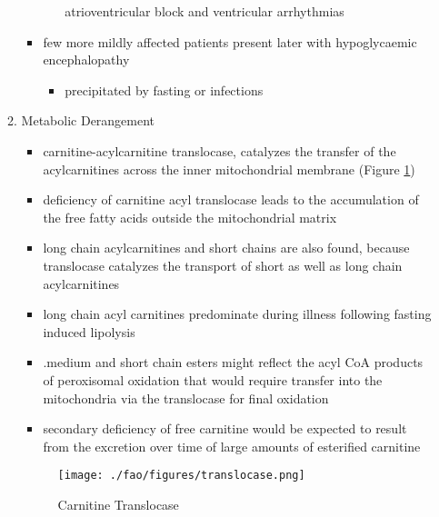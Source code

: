 \documentclass{scrartcl}
\begin{document}
\begin{enumerate}
\begin{enumerate}
\begin{itemize}
\begin{itemize}
atrioventricular block and ventricular arrhythmias
\end{itemize}
\item few more mildly affected patients present later with hypoglycaemic
encephalopathy
\begin{itemize}
\item precipitated by fasting or infections
\end{itemize}
\end{itemize}
\item Metabolic Derangement
\label{sec:orga067332}
\begin{itemize}
\item carnitine-acylcarnitine translocase, catalyzes the transfer of the
acylcarnitines across the inner mitochondrial membrane (Figure \ref{fig:orge1080ca})
\item deficiency of carnitine acyl translocase leads to the accumulation
of the free fatty acids outside the mitochondrial matrix
\item long chain acylcarnitines and short chains are also found, because
translocase catalyzes the transport of short as well as long chain
acylcarnitines
\item long chain acyl carnitines predominate during illness following
fasting induced lipolysis
\item .medium and short chain esters might reflect the acyl CoA products
of peroxisomal oxidation that would require transfer into the
mitochondria via the translocase for final oxidation
\item secondary deficiency of free carnitine would be expected to result
from the excretion over time of large amounts of esterified
carnitine
\end{itemize}

\begin{figure}[htbp]
\centering
\texttt{[image: ./fao/figures/translocase.png]}
\caption{\label{fig:orge1080ca}
Carnitine Translocase}
\end{figure}


\end{enumerate}
\end{enumerate}
\end{document}
